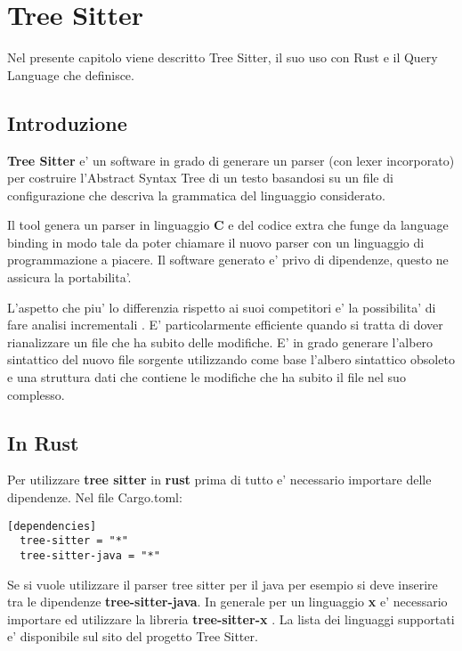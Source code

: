 \chapter{Tree Sitter}

Nel presente capitolo viene descritto Tree Sitter, il suo uso con Rust e il Query Language che definisce.

\section{Introduzione}

\textbf{Tree Sitter} \cite{TreeSitter} e' un software in grado di generare un parser (con lexer incorporato) per costruire l'Abstract Syntax Tree di un testo basandosi su un file di configurazione che descriva la grammatica del linguaggio considerato.

Il tool \cite{TreeSitterCreatingParsers} genera un parser in linguaggio \textbf{C} e del codice extra che funge da language binding in modo tale da poter chiamare il nuovo parser con un linguaggio di programmazione a piacere.
Il software generato e' privo di dipendenze, questo ne assicura la portabilita'.

L'aspetto che piu' lo differenzia rispetto ai suoi competitori e' la possibilita' di fare analisi incrementali \cite{TreeSitterAdvancedParsing}.
E' particolarmente efficiente quando si tratta di dover rianalizzare un file che ha subito delle modifiche.
E' in grado generare l'albero sintattico del nuovo file sorgente utilizzando come base l'albero sintattico obsoleto e una struttura dati che contiene le modifiche che ha subito il file nel suo complesso.

\section{In Rust}

Per utilizzare \textbf{tree sitter} in \textbf{rust} \cite{TreeSitterCrate} prima di tutto e' necessario importare delle dipendenze. Nel file Cargo.toml:

\begin{Verbatim}[samepage=true]
  [dependencies]
  tree-sitter = "*"
  tree-sitter-java = "*"
\end{Verbatim}

Se si vuole utilizzare il parser tree sitter per il java per esempio si deve inserire tra le dipendenze \textbf{tree-sitter-java}.
In generale per un linguaggio \textbf{x} e' necessario importare ed utilizzare la libreria \textbf{tree-sitter-x} \cite{TreeSitterRustGrammars}.
La lista dei linguaggi supportati e' disponibile sul sito del progetto Tree Sitter.

